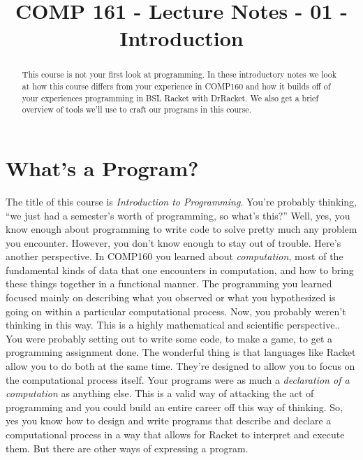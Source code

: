 \documentclass[]{tufte-handout}
\title{COMP 161 - Lecture Notes - 01 - Introduction}
\begin{document}
\maketitle

\begin{abstract}
This course is not your first look at programming. In these introductory notes we look at how this course differs from your experience in COMP160 and how it builds off of your experiences programming in BSL Racket with DrRacket.  We also get a brief overview of tools we'll use to craft our programs in this course. 
\end{abstract}

\section{What's a Program?}

The title of this course is \textit{Introduction to Programming}.  You're probably thinking, ``we just had a semester's worth of programming, so what's this?''  Well, yes, you know enough about programming to write code to solve pretty much any problem you encounter. However, you don't know enough to stay out of trouble.  Here's another perspective.  In COMP160 you learned about \textit{computation}, most of the fundamental kinds of data  that one encounters in computation, and how to bring these things together in a functional manner.  The programming you learned focused mainly on describing what you observed or what you hypothesized is going on within a particular computational process.  Now, you probably weren't thinking in this way. This is a highly mathematical and scientific perspective..   You were probably setting out to write some code, to make a game, to get a programming assignment done.  The wonderful thing is that languages like Racket allow you to do both at the same time.  They're designed to allow you to focus on the computational process itself.  Your programs were as much a \textit{declaration of a computation} as anything else.  This is a valid way of attacking the act of programming and you could build an entire career off this way of thinking.  So, yes you know how to design and write programs that describe and declare a computational process in a way that allows for Racket to interpret and execute them. But there are other ways of expressing a program.
\end{document}

